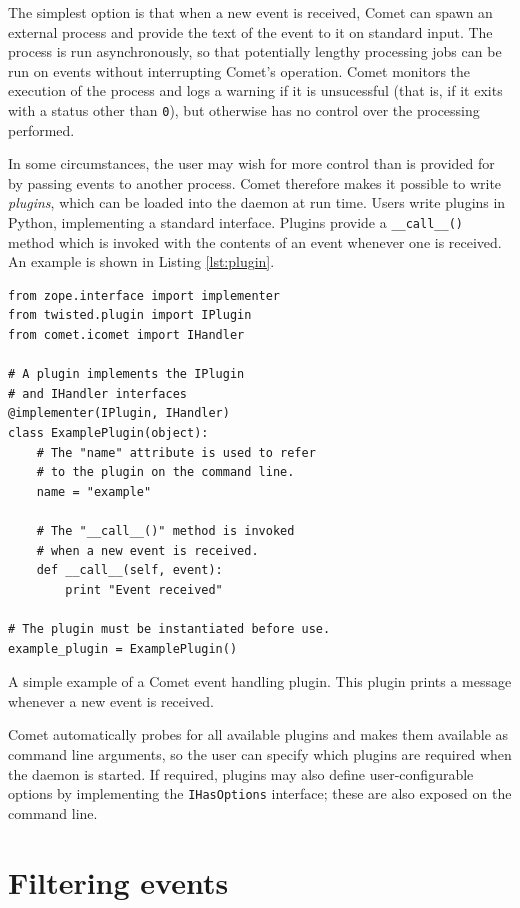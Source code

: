 \documentclass[5p,authoryear]{elsarticle}
\begin{document}
The simplest option is that when a new event is received, Comet can spawn an
external process and provide the text of the event to it on standard input.
The process is run asynchronously, so that potentially lengthy processing jobs
can be run on events without interrupting Comet's operation. Comet monitors
the execution of the process and logs a warning if it is unsucessful (that
is, if it exits with a status other than \texttt{0}), but otherwise has no
control over the processing performed.

In some circumstances, the user may wish for more control than is provided for
by passing events to another process. Comet therefore makes it possible to
write \textit{plugins}, which can be loaded into the daemon at run time.
Users write plugins in Python, implementing a standard interface. Plugins
provide a \texttt{\_\_call\_\_()} method which is invoked with the contents of
an event whenever one is received. An example is shown in Listing
\ref{lst:plugin}.

\begin{listing}[H]
\begin{verbatim}
from zope.interface import implementer
from twisted.plugin import IPlugin
from comet.icomet import IHandler

# A plugin implements the IPlugin
# and IHandler interfaces
@implementer(IPlugin, IHandler)
class ExamplePlugin(object):
    # The "name" attribute is used to refer
    # to the plugin on the command line.
    name = "example"

    # The "__call__()" method is invoked
    # when a new event is received.
    def __call__(self, event):
        print "Event received"

# The plugin must be instantiated before use.
example_plugin = ExamplePlugin()
\end{verbatim}
\caption{A simple example of a Comet event handling plugin. This plugin prints
a message whenever a new event is received.}
\label{lst:plugin}
\end{listing}

Comet automatically probes for all available plugins and makes them available
as command line arguments, so the user can specify which plugins are required
when the daemon is started. If required, plugins may also define
user-configurable options by implementing the \texttt{IHasOptions} interface;
these are also exposed on the command line.

\section{Filtering events}
\label{sec:filter}
\end{document}
